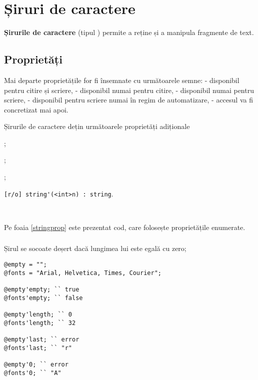 \section{Șiruri de caractere}

{\bf Șirurile de caractere} (tipul \str{}) permite a reține și a manipula fragmente de text. 

\subsection{Proprietăți}

Mai departe proprietățile for fi însemnate cu următoarele semne: \code{[r/w]} - disponibil pentru citire și scriere, \code{[r/o]} - disponibil numai pentru citire, \code{[w/o]} - disponibil numai pentru scriere,  \code{[r/*]} - disponibil pentru scriere numai în regim de automatizare, \code{[*/*]} - accesul va fi concretizat mai apoi.

Șirurile de caractere dețin următoarele proprietăți adiționale
\begin{icItems}
\item
	;
\item
	;
\item
	;
\item
	\lstinline|[r/o] string'(<int>n) : string|.
\end{icItems}

\

Pe foaia \ref{stringprop} este prezentat cod, care folosește proprietățile enumerate.

\subsubsection{}

Șirul se socoate deșert dacă lungimea lui este egală cu zero;

\begin{lstlisting}[caption=Proprietățile clasei string, label=stringprop]
@empty = "";
@fonts = "Arial, Helvetica, Times, Courier";

@empty'empty; `` true
@fonts'empty; `` false

@empty'length; `` 0
@fonts'length; `` 32

@empty'last; `` error
@fonts'last; `` "r"

@empty'0; `` error
@fonts'0; `` "A"
\end{lstlisting}

